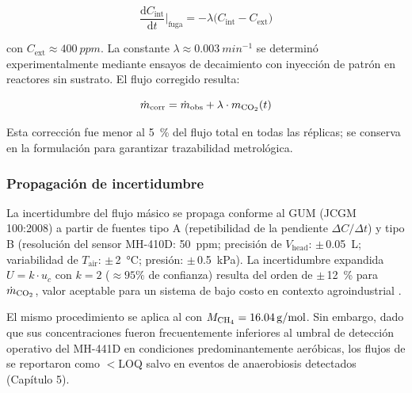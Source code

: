 \begin{equation}
\frac{\mathrm{d} C_{\text{int}}}{\mathrm{d} t}\bigg|_{\text{fuga}} 
= -\lambda \bigl(C_{\text{int}} - C_{\text{ext}}\bigr)
\label{eq:decaimiento_fuga}
\end{equation}

con $C_{\text{ext}} \approx \SI{400}{ppm}$. La constante $\lambda \approx \SI{0.003}{min^{-1}}$ se determinó experimentalmente mediante ensayos de decaimiento con inyección de  patrón en reactores sin sustrato. El flujo corregido resulta:

\begin{equation}
\dot{m}_{\text{corr}} = \dot{m}_{\text{obs}} + \lambda \cdot m_{\ce{CO2}}(t)
\label{eq:flujo_corregido}
\end{equation}

Esta corrección fue menor al \SI{5}{\percent} del flujo total en todas las réplicas; se conserva en la formulación para garantizar trazabilidad metrológica.

\subsubsection{Propagación de incertidumbre}

La incertidumbre del flujo másico se propaga conforme al GUM (JCGM 100:2008) \parencite{jcgmEvaluationMeasurementData2008} a partir de fuentes tipo A (repetibilidad de la pendiente $\Delta C/\Delta t$) y tipo B (resolución del sensor MH-410D: \SI{50}{ppm}; precisión de $V_{\text{head}}$: $\pm$\,\SI{0.05}{L}; variabilidad de $T_{\text{air}}$: $\pm$\,\SI{2}{\celsius}; presión: $\pm$\,\SI{0.5}{kPa}). La incertidumbre expandida $U = k \cdot u_c$ con $k=2$ ($\approx 95\%$ de confianza) resulta del orden de $\pm$\,\SI{12}{\percent} para $\dot{m}_{\ce{CO2}}$, valor aceptable para un sistema de bajo costo en contexto agroindustrial \parencite{biagiDevelopmentMachineLearningbased2024a, parodiBioconversionEfficienciesGreenhouse2020a}.

El mismo procedimiento se aplica al  con $M_{\ce{CH4}} = \SI{16.04}{g/mol}$. Sin embargo, dado que sus concentraciones fueron frecuentemente inferiores al umbral de detección operativo del MH-441D en condiciones predominantemente aeróbicas, los flujos de  se reportaron como $<$LOQ salvo en eventos de anaerobiosis detectados (Capítulo 5).
